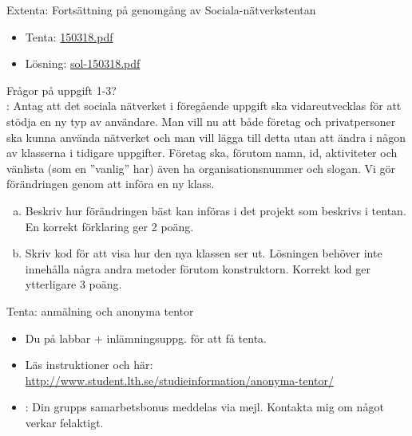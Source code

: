 \documentclass{lecturenotes}
\begin{document}
\begin{Slide}{Extenta: Fortsättning på genomgång av Sociala-nätverkstentan}
\begin{itemize}
\item Tenta: \href{http://fileadmin.cs.lth.se/cs//Education/grundkurs/extentor/150318.pdf}{150318.pdf}
\item Lösning: \href{http://fileadmin.cs.lth.se/cs//Education/grundkurs/extentor/sol-150318.pdf}{sol-150318.pdf}
\end{itemize}
Frågor på uppgift 1-3? \newline \\ \pause
\scriptsize {}:  
Antag att det sociala nätverket i föregående uppgift ska vidareutvecklas för att stödja en ny typ av användare. Man vill nu att både företag och privatpersoner ska kunna använda nätverket och man vill lägga till detta utan att ändra i någon av klasserna i tidigare uppgifter. Företag ska, förutom namn, id, aktiviteter och vänlista (som en ''vanlig''  har) även ha organisationsnummer och slogan. Vi gör förändringen genom att införa en ny klass.
\\
\begin{enumerate}[a.] %
\item Beskriv hur förändringen bäst kan införas i det projekt som beskrivs i tentan. En korrekt förklaring ger 2 poäng.
\item Skriv kod för att visa hur den nya klassen ser ut. Lösningen behöver inte innehålla några andra metoder förutom konstruktorn. Korrekt kod ger ytterligare 3 poäng.
\end{enumerate}

\end{Slide}

\begin{Slide}{Tenta: anmälning och anonyma tentor}
\begin{itemize}
\item Du  på  labbar + inlämningsuppg. för att få tenta.
\item Läs  instruktioner  och  här: \\ \url{http://www.student.lth.se/studieinformation/anonyma-tentor/}
\item {}: Din grupps samarbetsbonus meddelas via mejl. Kontakta mig om något verkar felaktigt. 
\end{itemize}
\end{Slide}
\end{document}
